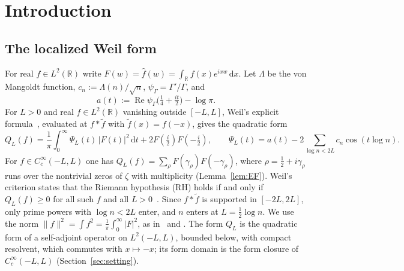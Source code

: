 \documentclass[11pt]{amsart}
\newcommand{\R}{\mathbb{R}}
\newcommand{\dd}{\,\mathrm{d}}
\newcommand{\dig}{\psi_\Gamma}
\DeclareMathOperator{\re}{Re}
\theoremstyle{definition}
\theoremstyle{remark}
\numberwithin{equation}{section}
\begin{document}
\begin{abstract}
\end{abstract}

\maketitle
\enlargethispage{3pt}


\section{Introduction}\label{sec:intro}

\subsection{The localized Weil form}
For real $f\in L^2(\R)$ write $F(w)=\hat f(w)=\int_\R f(x)e^{ixw}\dd x$. Let $\Lambda$ be the von Mangoldt function, $c_n:=\Lambda(n)/\sqrt n$, $\dig=\Gamma'/\Gamma$, and
\[
a(t):=\re\dig\bigl(\tfrac14+\tfrac{it}2\bigr)-\log\pi .
\]
For $L>0$ and real $f\in L^2(\R)$ vanishing outside $[-L,L]$, Weil's explicit formula~\cite{Wei52}, evaluated at $f*\tilde f$ with $\tilde f(x)=f(-x)$, gives the quadratic form
\begin{equation}\label{eq:QL}
Q_L(f)=\frac1\pi\int_0^\infty\Psi_L(t)\,|F(t)|^2\dd t+2F(\tfrac i2)F(-\tfrac i2),\qquad \Psi_L(t)=a(t)-2\sum_{\log n<2L}c_n\cos(t\log n).
\end{equation}
For $f\in C_c^\infty(-L,L)$ one has $Q_L(f)=\sum_\rho F(\gamma_\rho)F(-\gamma_\rho)$, where $\rho=\frac12+i\gamma_\rho$ runs over the nontrivial zeros of $\zeta$ with multiplicity (Lemma~\ref{lem:EF}). Weil's criterion states that the Riemann hypothesis (RH) holds if and only if $Q_L(f)\ge0$ for all such $f$ and all $L>0$~\cite{Wei52,Bom00}. Since $f*\tilde f$ is supported in $[-2L,2L]$, only prime powers with $\log n<2L$ enter, and $n$ enters at $L=\frac12\log n$. We use the norm $\|f\|^2=\int f^2=\frac1\pi\int_0^\infty|F|^2$, as in~\cite{Zhu} and \cite[\S2]{GS}. The form $Q_L$ is the quadratic form of a self-adjoint operator on $L^2(-L,L)$, bounded below, with compact resolvent, which commutes with $x\mapsto-x$; its form domain is the form closure of $C_c^\infty(-L,L)$ (Section~\ref{sec:setting}).
\end{document}
